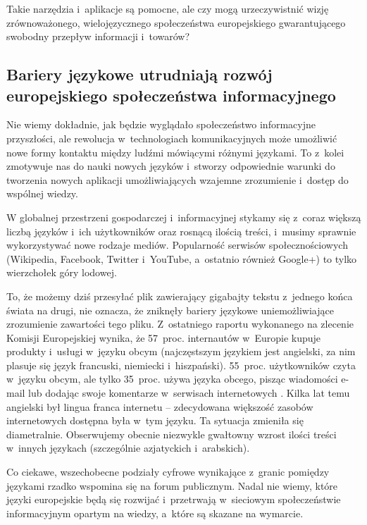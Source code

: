 \begin{multicols}{2}
Takie narzędzia i~aplikacje są pomocne, ale czy mogą
urzeczywistnić wizję zrównoważonego, wielojęzycznego
społeczeństwa europejskiego gwarantującego swobodny przepływ
informacji i~towarów? 

\subsection{Bariery językowe utrudniają rozwój europejskiego
społeczeństwa informacyjnego} Nie wiemy dokładnie, jak będzie
wyglądało społeczeństwo informacyjne przyszłości, ale rewolucja
w~technologiach komunikacyjnych może umożliwić nowe formy kontaktu
między ludźmi mówiącymi różnymi językami. To z~kolei zmotywuje
nas do nauki nowych języków i~stworzy odpowiednie warunki do
tworzenia nowych aplikacji umożliwiających wzajemne zrozumienie
i~dostęp do wspólnej wiedzy. 


W globalnej przestrzeni gospodarczej i~informacyjnej stykamy się
z~coraz większą liczbą języków i~ich użytkowników oraz
rosnącą ilością treści, i~musimy sprawnie wykorzystywać nowe
rodzaje mediów. Popularność serwisów społecznościowych
(Wikipedia, Facebook, Twitter i~YouTube, a~ostatnio również Google+)
to tylko wierzchołek góry lodowej. 

To, że możemy dziś przesyłać plik zawierający gigabajty tekstu
z~jednego końca świata na drugi, nie oznacza, że zniknęły bariery
językowe uniemożliwiające zrozumienie zawartości tego pliku.
Z~ostatniego raportu wykonanego na zlecenie Komisji Europejskiej
wynika, że 57~proc. internautów w~Europie kupuje produkty i~usługi
w~języku obcym (najczęstszym językiem jest angielski, za nim
plasuje się język francuski, niemiecki i~hiszpański). 55~proc.
użytkowników czyta w~języku obcym, ale tylko 35~proc. używa
języka obcego, pisząc wiadomości e-mail lub dodając swoje
komentarze w~serwisach internetowych \cite{EC1}. Kilka lat temu
angielski był lingua franca internetu – zdecydowana większość
zasobów internetowych dostępna była w~tym języku. Ta sytuacja
zmieniła się diametralnie. Obserwujemy obecnie niezwykle gwałtowny
wzrost ilości treści w~innych językach (szczególnie azjatyckich
i~arabskich). 

Co ciekawe, wszechobecne podziały cyfrowe wynikające z~granic
pomiędzy językami rzadko wspomina się na forum publicznym. Nadal
nie wiemy, które języki europejskie będą się rozwijać
i~przetrwają w~sieciowym społeczeństwie informacyjnym opartym na
wiedzy, a~które są skazane na wymarcie. 


\end{multicols}
